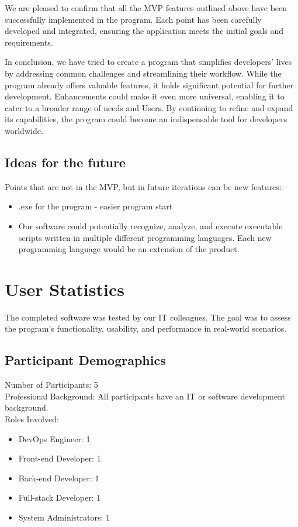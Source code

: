 \documentclass{article}
\begin{document}
We are pleased to confirm that all the MVP features outlined above have been successfully implemented in the program. Each point has been carefully developed and integrated, ensuring the application meets the initial goals and requirements.

In conclusion, we have tried to create a program that simplifies developers’ lives by addressing common challenges and streamlining their workflow. While the program already offers valuable features, it holds significant potential for further development. Enhancements could make it even more universal, enabling it to cater to a broader range of needs and Users. By continuing to refine and expand its capabilities, the program could become an indispensable tool for developers worldwide.

\subsection{Ideas for the future}

Points that are not in the MVP, but in future iterations can be new features:
    \begin{itemize}
        \item .exe for the program - easier program start
        \item Our software could potentially recognize, analyze, and execute executable scripts written in multiple different programming languages. Each new programming language would be an extension of the product.
    \end{itemize}

\clearpage

\section{User Statistics}
The completed software was tested by our IT colleagues. The goal was to assess the program's functionality, usability, and performance in real-world scenarios.

\subsection{Participant Demographics}
Number of Participants: 5\\
Professional Background: All participants have an IT or software development background. \\
Roles Involved:
\begin{itemize}
    \item DevOps Engineer: 1
    \item Front-end Developer: 1
    \item Back-end Developer: 1
    \item Full-stack Developer: 1
    \item System Administrators: 1
\end{itemize}
\end{document}
